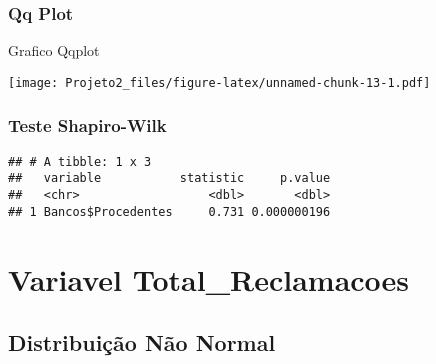 \documentclass[
]{article}
\newenvironment{Shaded}{\begin{snugshade}}{\end{snugshade}}
\newcommand{\AttributeTok}[1]{\textcolor[rgb]{0.77,0.63,0.00}{#1}}
\newcommand{\FunctionTok}[1]{\textcolor[rgb]{0.00,0.00,0.00}{#1}}
\newcommand{\NormalTok}[1]{#1}
\newcommand{\SpecialCharTok}[1]{\textcolor[rgb]{0.00,0.00,0.00}{#1}}
\newcommand{\StringTok}[1]{\textcolor[rgb]{0.31,0.60,0.02}{#1}}
\begin{document}
\hypertarget{qq-plot-1}{%
\subsubsection{Qq Plot}\label{qq-plot-1}}

Grafico Qqplot

\begin{Shaded}
\end{Shaded}

\texttt{[image: Projeto2\_files/figure-latex/unnamed-chunk-13-1.pdf]}

\hypertarget{teste-shapiro-wilk-1}{%
\subsubsection{Teste Shapiro-Wilk}\label{teste-shapiro-wilk-1}}

\begin{Shaded}
\end{Shaded}

\begin{verbatim}
## # A tibble: 1 x 3
##   variable           statistic     p.value
##   <chr>                  <dbl>       <dbl>
## 1 Bancos$Procedentes     0.731 0.000000196
\end{verbatim}

\hypertarget{variavel-total_reclamacoes}{%
\section{Variavel Total\_Reclamacoes}\label{variavel-total_reclamacoes}}

\hypertarget{distribuiuxe7uxe3o-nuxe3o-normal-1}{%
\subsection{Distribuição Não
Normal}\label{distribuiuxe7uxe3o-nuxe3o-normal-1}}
\end{document}
